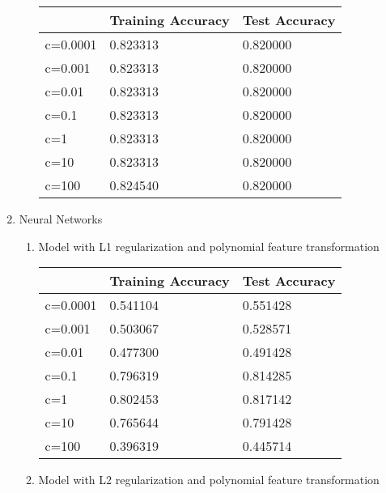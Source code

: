 \documentclass[12pt]{article}
\begin{document}
\begin{enumerate}
\begin{enumerate}
		\begin{center}
			\begin{tabular}{|l|l|l|}
				\hline
				& Training Accuracy & Test Accuracy \\ \hline
				c=0.0001 & 0.823313          & 0.820000      \\ \hline
				c=0.001  & 0.823313          & 0.820000      \\ \hline
				c=0.01   & 0.823313          & 0.820000      \\ \hline
				c=0.1    & 0.823313          & 0.820000      \\ \hline
				c=1      & 0.823313          & 0.820000      \\ \hline
				c=10     & 0.823313          & 0.820000      \\ \hline
				c=100    & 0.824540          & 0.820000      \\ \hline
			\end{tabular}
		\end{center}
		
	\end{enumerate}

	\pagebreak
	
	\item Neural Networks
	\begin{enumerate}
		\item Model with L1 regularization and polynomial feature transformation
		
		\begin{center}
			\begin{tabular}{|l|l|l|}
				\hline
				& Training Accuracy & Test Accuracy \\ \hline
				c=0.0001 & 0.541104          & 0.551428      \\ \hline
				c=0.001  & 0.503067          & 0.528571      \\ \hline
				c=0.01   & 0.477300          & 0.491428      \\ \hline
				c=0.1    & 0.796319          & 0.814285      \\ \hline
				c=1      & 0.802453          & 0.817142      \\ \hline
				c=10     & 0.765644          & 0.791428      \\ \hline
				c=100    & 0.396319          & 0.445714      \\ \hline
			\end{tabular}
		\end{center}
		
		\item Model with L2 regularization and polynomial feature transformation
		

\end{enumerate}
\end{enumerate}
\end{document}
